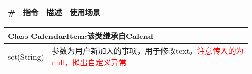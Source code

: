 \documentclass[UTF8,a4paper,12pt]{ctexart}%
\begin{document}
\begin{center}
	\begin{longtable}{|p{1cm}|p{2cm}|p{3cm}|p{4cm}|}
		\hline
		\#&指令&描述&使用场景\\ \hline \hline
		\endhead
	\end{longtable}
\end{center}

\begin{center}
	\begin{tabular}{|p{5cm}|p{6cm}|}
		\hline
		\multicolumn{2}{|p{11cm}|}{\textbf{Class  CalendarItem:}该类继承自Calend}\\ \hline
		set(String)& 参数为用户新加入的事项，用于修改text。\textcolor{red}{注意传入的为null，抛出自定义异常}\\ \hline
	\end{tabular}
\end{center}

\newpage
{}
\end{document}
